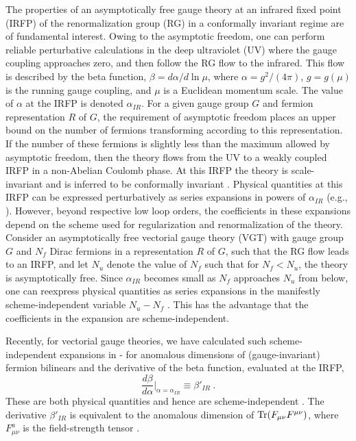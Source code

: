 \documentclass[prd,twocolumn,nofootinbib,amsfonts,amssymb]{revtex4}
\newcommand{\beq}{\begin{equation}}
\newcommand{\eeq}{\end{equation}}
\begin{document}
The properties of an asymptotically free gauge theory at an infrared fixed
point (IRFP) of the renormalization group (RG) in a conformally invariant
regime are of fundamental interest. Owing to the asymptotic freedom, one can
perform reliable perturbative calculations in the deep ultraviolet (UV) where
the gauge coupling approaches zero, and then follow the RG flow to the
infrared.  This flow is described by the beta function, $\beta =
d\alpha/d\ln\mu$, where $\alpha=g^2/(4\pi)$, $g=g(\mu)$ is the running gauge
coupling, and $\mu$ is a Euclidean momentum scale. The value of $\alpha$ at the
IRFP is denoted $\alpha_{IR}$. For a given gauge group $G$ and fermion
representation $R$ of $G$, the requirement of asymptotic freedom places an
upper bound on the number of fermions transforming according to this
representation.  If the number of these fermions is slightly less than the
maximum allowed by asymptotic freedom, then the theory flows from the UV to a
weakly coupled IRFP in a non-Abelian Coulomb phase.  At this IRFP the theory is
scale-invariant and is inferred to be conformally invariant \cite{scalecon}.
Physical quantities at this IRFP can be expressed perturbatively as series
expansions in powers of $\alpha_{IR}$ (e.g., \cite{bvh,ps,flir}).  However,
beyond respective low loop orders, the coefficients in these expansions depend
on the scheme used for regularization and renormalization of the theory.
Consider an asymptotically free vectorial gauge theory (VGT) with gauge group
$G$ and $N_f$ Dirac fermions in a representation $R$ of $G$, such that the RG
flow leads to an IRFP, and let $N_u$ denote the value of $N_f$ such that for
$N_f < N_u$, the theory is asymptotically free. Since $\alpha_{IR}$ becomes
small as $N_f$ approaches $N_u$ from below, one can reexpress physical
quantities as series expansions in the manifestly scheme-independent variable
$N_u-N_f$ \cite{bz}.  This has the advantage that the coefficients in the
expansion are scheme-independent.  

Recently, for vectorial gauge theories, we have calculated such
scheme-independent expansions in \cite{gtr}-\cite{dexo} for anomalous
dimensions of (gauge-invariant) fermion bilinears and the derivative of the
beta function, evaluated at the IRFP,
%
\beq
\frac{d\beta}{d\alpha} \Big |_{\alpha=\alpha_{IR}} \equiv \beta'_{IR} \ .
\label{betaprime_def}
\eeq
%
These are both physical quantities and hence are scheme-independent
\cite{gross75}. The derivative $\beta'_{IR}$ is equivalent to the anomalous
dimension of ${\rm Tr}(F_{\mu\nu}F^{\mu\nu})$, where $F_{\mu\nu}^a$ is the
field-strength tensor \cite{traceanomaly}.  
\end{document}

